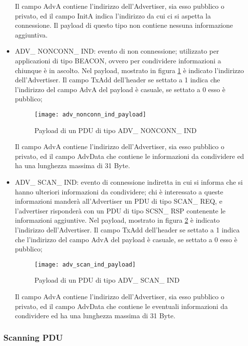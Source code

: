 \begin{itemize}
Il campo AdvA contiene l'indirizzo dell'Advertiser, sia esso pubblico o privato, ed il campo InitA indica l'indirizzo da cui ci si aspetta la connessione. Il payload di questo tipo non contiene nessuna informazione aggiuntiva.

\item ADV\_ NONCONN\_ IND: evento di non connessione; utilizzato per applicazioni di tipo BEACON, ovvero per condividere informazioni a chiunque è in ascolto. Nel  payload, mostrato in figura \ref{adv_nonconn_ind_payload} è indicato l'indirizzo dell'Advertiser. Il campo TxAdd dell'header se settato a 1 indica che l'indirizzo del campo AdvA del payload è casuale, se settato a 0 esso è pubblico;

\begin{figure}[H]
\texttt{[image: adv\_nonconn\_ind\_payload]}
\centering
\caption{Payload di un PDU di tipo ADV\_ NONCONN\_ IND }
\label{adv_nonconn_ind_payload}
\end{figure}

Il campo AdvA contiene l'indirizzo dell'Advertiser, sia esso pubblico o privato, ed il campo AdvData che contiene le informazioni da condividere ed ha una lunghezza massima di 31 Byte.

\item ADV\_ SCAN\_ IND: evento di connessione indiretta in cui si informa che si hanno ulteriori informazioni da condividere; chi è interessato a queste informazioni manderà all'Advertiser un PDU di tipo SCAN\_ REQ, e l'advertiser risponderà con un PDU di tipo SCSN\_ RSP contenente le informazioni aggiuntive. Nel  payload, mostrato in figura \ref{adv_scan_ind_payload} è indicato l'indirizzo dell'Advertiser. Il campo TxAdd dell'header se settato a 1 indica che l'indirizzo del campo AdvA del payload è casuale, se settato a 0 esso è pubblico;

\begin{figure}[H]
\texttt{[image: adv\_scan\_ind\_payload]}
\centering
\caption{Payload di un PDU di tipo ADV\_ SCAN\_ IND }
\label{adv_scan_ind_payload}
\end{figure}

Il campo AdvA contiene l'indirizzo dell'Advertiser, sia esso pubblico o privato, ed il campo AdvData che contiene le eventuali informazioni da condividere ed ha una lunghezza massima di 31 Byte.

\end{itemize}

\subsubsection{Scanning PDU}

